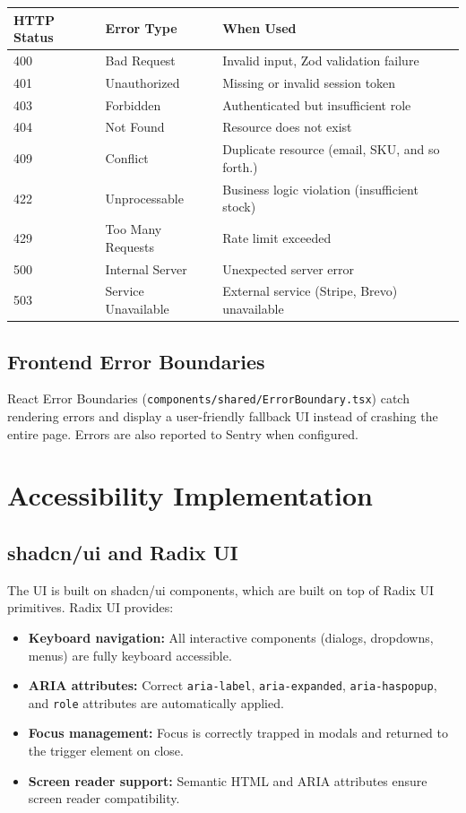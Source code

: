 \documentclass[12pt,a4paper]{report}
\begin{document}
\begin{center}
\begin{tabularx}{\textwidth}{llX}
  \toprule
  \textbf{HTTP Status} & \textbf{Error Type} & \textbf{When Used} \\
  \midrule
  400 & Bad Request       & Invalid input, Zod validation failure \\
  401 & Unauthorized      & Missing or invalid session token \\
  403 & Forbidden         & Authenticated but insufficient role \\
  404 & Not Found         & Resource does not exist \\
  409 & Conflict          & Duplicate resource (email, SKU, and so forth.) \\
  422 & Unprocessable     & Business logic violation (insufficient stock) \\
  429 & Too Many Requests & Rate limit exceeded \\
  500 & Internal Server   & Unexpected server error \\
  503 & Service Unavailable & External service (Stripe, Brevo) unavailable \\
  \bottomrule
\end{tabularx}
\end{center}

\subsection{Frontend Error Boundaries}

React Error Boundaries (\texttt{components/shared/ErrorBoundary.tsx}) catch rendering errors and display a user-friendly fallback UI instead of crashing the entire page. Errors are also reported to Sentry when configured.

\section{Accessibility Implementation}

\subsection{shadcn/ui and Radix UI}

The UI is built on shadcn/ui components, which are built on top of Radix UI primitives. Radix UI provides:
\begin{itemize}[leftmargin=1.5em]
  \item \textbf{Keyboard navigation:} All interactive components (dialogs, dropdowns, menus) are fully keyboard accessible.
  \item \textbf{ARIA attributes:} Correct \texttt{aria-label}, \texttt{aria-expanded}, \texttt{aria-haspopup}, and \texttt{role} attributes are automatically applied.
  \item \textbf{Focus management:} Focus is correctly trapped in modals and returned to the trigger element on close.
  \item \textbf{Screen reader support:} Semantic HTML and ARIA attributes ensure screen reader compatibility.
\end{itemize}
\end{document}
